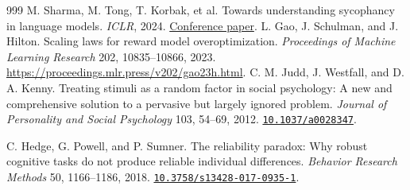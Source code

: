 \documentclass[10pt,twocolumn,letterpaper]{article}
\newcommand{\doi}[1]{\href{https://doi.org/#1}{\nolinkurl{#1}}}
\begin{document}
\begin{thebibliography}{999}
 M. Sharma, M. Tong, T. Korbak, et al. Towards understanding sycophancy in language models. \emph{ICLR}, 2024. \href{https://proceedings.iclr.cc/paper_files/paper/2024/hash/0105f7972202c1d4fb817da9f21a9663-Abstract-Conference.html}{Conference paper}.
 L. Gao, J. Schulman, and J. Hilton. Scaling laws for reward model overoptimization. \emph{Proceedings of Machine Learning Research} 202, 10835--10866, 2023. \url{https://proceedings.mlr.press/v202/gao23h.html}.
 C. M. Judd, J. Westfall, and D. A. Kenny. Treating stimuli as a random factor in social psychology: A new and comprehensive solution to a pervasive but largely ignored problem. \emph{Journal of Personality and Social Psychology} 103, 54--69, 2012. \doi{10.1037/a0028347}.

 C. Hedge, G. Powell, and P. Sumner. The reliability paradox: Why robust cognitive tasks do not produce reliable individual differences. \emph{Behavior Research Methods} 50, 1166--1186, 2018. \doi{10.3758/s13428-017-0935-1}.


\end{thebibliography}
\end{document}

